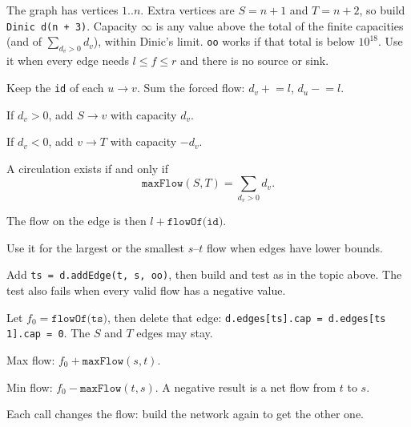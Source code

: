 {\footnotesize\tightdisplay
The graph has vertices $1..n$. Extra vertices are $S = n + 1$ and $T = n + 2$, so build \texttt{Dinic d(n + 3)}. Capacity $\infty$ is any value above the total of the finite capacities (and of $\sum_{d_v > 0} d_v$), within Dinic's limit. \texttt{oo} works if that total is below $10^{18}$.
Use it when every edge needs $l \le f \le r$ and there is no source or sink.
\begin{facts}
	\item Keep the \texttt{id} of each $u \to v$. Sum the forced flow: $d_v \mathrel{+}= l$, $d_u \mathrel{-}= l$.
	\item If $d_v > 0$, add $S \to v$ with capacity $d_v$.
	\item If $d_v < 0$, add $v \to T$ with capacity $-d_v$.
	\item A circulation exists if and only if
	\[ \texttt{maxFlow}(S, T) = \textstyle\sum_{d_v > 0} d_v. \]
	\item The flow on the edge is then $l + \texttt{flowOf(id)}$.
\end{facts}
Use it for the largest or the smallest $s$--$t$ flow when edges have lower bounds.
\begin{facts}
	\item Add \texttt{ts = d.addEdge(t, s, oo)}, then build and test as in the topic above. The test also fails when every valid flow has a negative value.
	\item Let $f_0 = \texttt{flowOf(ts)}$, then delete that edge: \texttt{d.edges[ts].cap = d.edges[ts  1].cap = 0}. The $S$ and $T$ edges may stay.
	\item Max flow: $f_0 + \texttt{maxFlow}(s, t)$.
	\item Min flow: $f_0 - \texttt{maxFlow}(t, s)$. A negative result is a net flow from $t$ to $s$.
	\item Each call changes the flow: build the network again to get the other one.

\end{facts}}
